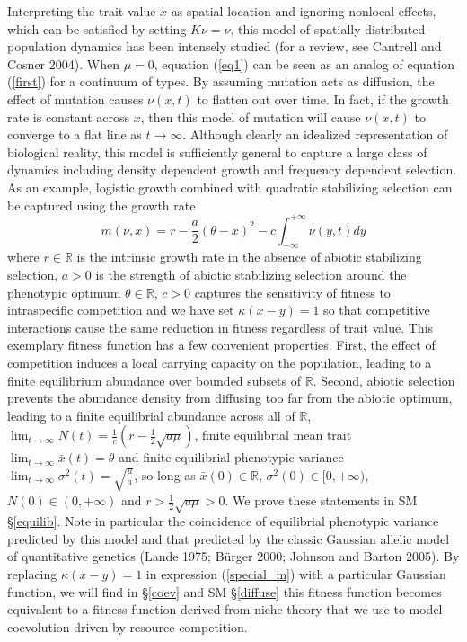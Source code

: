 \documentclass[]{article}
\begin{document}
Interpreting the trait value \(x\) as spatial location and ignoring
nonlocal effects, which can be satisfied by setting \(K\nu=\nu\), this
model of spatially distributed population dynamics has been intensely
studied (for a review, see Cantrell and Cosner 2004). When \(\mu=0\),
equation (\ref{eq1}) can be seen as an analog of equation (\ref{first})
for a continuum of types. By assuming mutation acts as diffusion, the
effect of mutation causes \(\nu(x,t)\) to flatten out over time. In
fact, if the growth rate is constant across \(x\), then this model of
mutation will cause \(\nu(x,t)\) to converge to a flat line as
\(t\to\infty\). Although clearly an idealized representation of
biological reality, this model is sufficiently general to capture a
large class of dynamics including density dependent growth and frequency
dependent selection. As an example, logistic growth combined with
quadratic stabilizing selection can be captured using the growth rate
\begin{equation}\label{special_m}
m(\nu,x)=r-\frac{a}{2}(\theta-x)^2-c\int_{-\infty}^{+\infty}\nu(y,t)dy
\end{equation} where \(r\in\mathbb{R}\) is the intrinsic growth rate in
the absence of abiotic stabilizing selection, \(a>0\) is the strength of
abiotic stabilizing selection around the phenotypic optimum
\(\theta\in\mathbb{R}\), \(c>0\) captures the sensitivity of fitness to
intraspecific competition and we have set \(\kappa(x-y)=1\) so that
competitive interactions cause the same reduction in fitness regardless
of trait value. This exemplary fitness function has a few convenient
properties. First, the effect of competition induces a local carrying
capacity on the population, leading to a finite equilibrium abundance
over bounded subsets of \(\mathbb{R}\). Second, abiotic selection
prevents the abundance density from diffusing too far from the abiotic
optimum, leading to a finite equilibrial abundance across all of
\(\mathbb{R}\),
\(\lim_{t\to\infty}N(t)=\tfrac{1}{c}(r-\tfrac{1}{2}\sqrt{a\mu})\),
finite equilibrial mean trait \(\lim_{t\to\infty}\bar x(t)=\theta\) and
finite equilibrial phenotypic variance
\(\lim_{t\to\infty}\sigma^2(t)=\sqrt{\frac{\mu}{a}}\), so long as
\(\bar x(0)\in\mathbb{R}\), \(\sigma^2(0)\in[0,+\infty)\),
\(N(0)\in(0,+\infty)\) and \(r>\frac{1}{2}\sqrt{a\mu}>0\). We prove
these statements in SM \S\ref{equilib}. Note in particular the
coincidence of equilibrial phenotypic variance predicted by this model
and that predicted by the classic Gaussian allelic model of quantitative
genetics (Lande 1975; Bürger 2000; Johnson and Barton 2005). By
replacing \(\kappa(x-y)=1\) in expression (\ref{special_m}) with a
particular Gaussian function, we will find in \S\ref{coev} and SM
\S\ref{diffuse} this fitness function becomes equivalent to a fitness
function derived from niche theory that we use to model coevolution
driven by resource competition.
\end{document}
